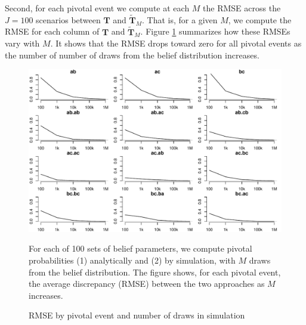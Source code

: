 \documentclass[11pt,a4paper]{article}
\begin{document}
Second, for each pivotal event we compute at each $M$ the RMSE across the $J=100$ scenarios between $\mathbf{T}$ and $\mathbf{\tilde{T}}_M$. That is, for a given $M$, we compute the RMSE for each column of $\mathbf{T}$ and $\mathbf{\tilde{T}}_M$. Figure \ref{rmse_box} summarizes how these RMSEs vary with $M$. It shows that the RMSE drops toward zero for all pivotal events as the number of number of draws from the belief distribution increases.

\begin{figure}\caption{RMSE by pivotal event and number of draws in simulation \label{rmse_box}}
\begin{center}
\includegraphics[width=\textwidth]{./../../output/figs/rmses/rmse_by_pivotal_event_by_number_of_simulations_no_trunc_dirichlet_v2.pdf} %
\end{center} 
\footnotesize{ For each of 100 sets of belief parameters, we compute pivotal probabilities (1) analytically and (2) by simulation, with $M$ draws from the belief distribution. The figure shows, for each pivotal event, the average discrepancy (RMSE) between the two approaches as $M$ increases.} 
\end{figure}  

\end{document}
